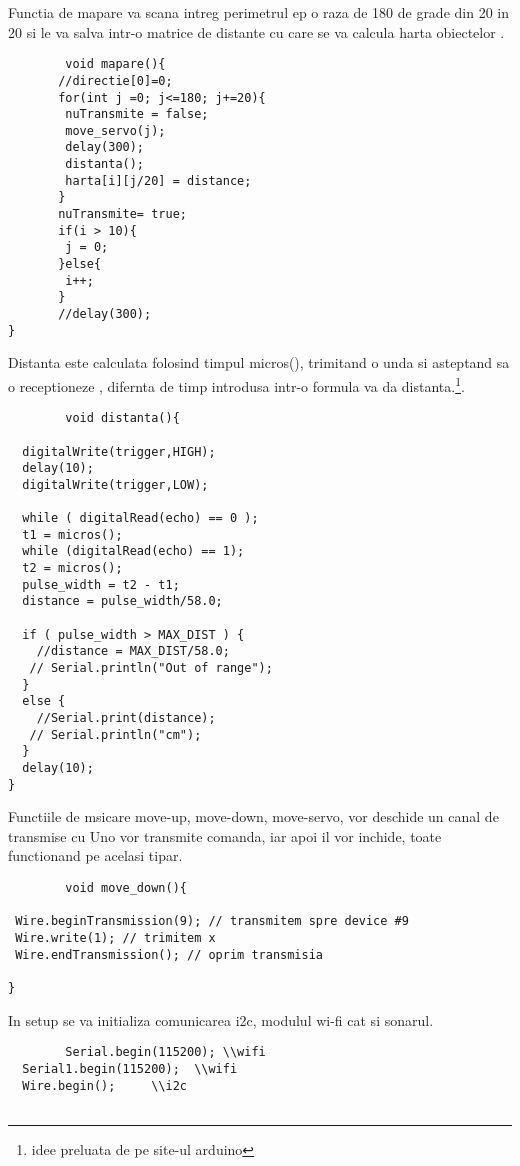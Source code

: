 \begin{itemize}
\begin{verbatim}
	\end{verbatim}
		

	\tab Functia de mapare va scana intreg perimetrul ep o raza de 180 de grade din 20 in 20 si le va salva intr-o matrice de distante cu care se va calcula harta obiectelor .\\
	\begin{verbatim}
		void mapare(){
       //directie[0]=0;
       for(int j =0; j<=180; j+=20){
        nuTransmite = false;
        move_servo(j);
        delay(300);
        distanta();
        harta[i][j/20] = distance;
       }
       nuTransmite= true;
       if(i > 10){
        j = 0;
       }else{
        i++;
       }
       //delay(300);
}
	\end{verbatim}

	\tab Distanta este calculata folosind timpul micros(), trimitand o unda si asteptand sa o receptioneze , difernta de timp introdusa intr-o formula va da distanta.\footnote{idee preluata de pe site-ul arduino}.
	\begin{verbatim}
		void distanta(){
 
  digitalWrite(trigger,HIGH);
  delay(10);
  digitalWrite(trigger,LOW);
 
  while ( digitalRead(echo) == 0 );
  t1 = micros();
  while (digitalRead(echo) == 1);
  t2 = micros();
  pulse_width = t2 - t1;
  distance = pulse_width/58.0;
 
  if ( pulse_width > MAX_DIST ) {
    //distance = MAX_DIST/58.0;
   // Serial.println("Out of range");
  }
  else {
    //Serial.print(distance);
   // Serial.println("cm");
  }
  delay(10);
}
	\end{verbatim}

	\tab Functiile de msicare move-up, move-down, move-servo, vor deschide un canal de transmise cu Uno vor transmite comanda, iar apoi il vor inchide, toate functionand pe acelasi tipar.\\

	\begin{verbatim}
		void move_down(){
 
 Wire.beginTransmission(9); // transmitem spre device #9
 Wire.write(1); // trimitem x
 Wire.endTransmission(); // oprim transmisia

}
	\end{verbatim}

	\tab In setup se va initializa comunicarea i2c, modulul wi-fi cat si sonarul.\\

	\begin{verbatim}
		Serial.begin(115200); \\wifi
  Serial1.begin(115200);  \\wifi
  Wire.begin(); 	\\i2c
 

\end{verbatim}
\end{itemize}
